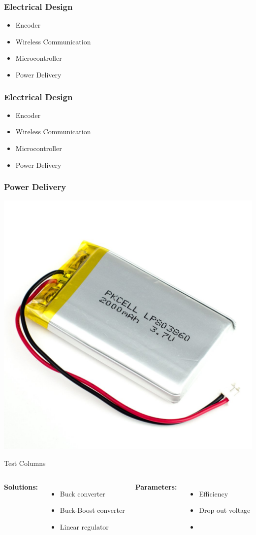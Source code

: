 \documentclass[mathserif]{beamer}
\begin{document}
\begin{frame}[c]\frametitle{Electrical Design}
	\begin{itemize}
    	\item Encoder
    	\item Wireless Communication
    	\item Microcontroller
    	\item Power Delivery
    \end{itemize}    
\end{frame}

\begin{frame}[c]\frametitle{Electrical Design}
	\begin{itemize}
    	\item Encoder
    	\item Wireless Communication
    	\item Microcontroller
    	\item \alert{Power Delivery}
    \end{itemize}    
\end{frame}

\begin{frame}[c]\frametitle{Power Delivery}
	\centering
	\vfill
    \includegraphics[width=.35\linewidth]{graphics/lipo}\\
    \vfill
    \vfill
\end{frame}

\begin{frame}[c]{Test Columns}
\begin{columns}
\textbf{Solutions:}   
\begin{itemize}
			\item Buck converter
			\item Buck-Boost converter
			\item Linear regulator
\end{itemize}
\textbf{Parameters:}
\begin{itemize}
			\item Efficiency
			\item Drop out voltage
			\item []
\end{itemize}
\end{columns}
\end{frame}
\end{document}
